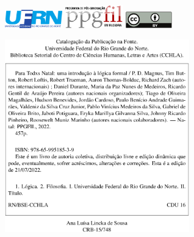 \begin{figure}[b]
  \begin{minipage}{0.33\textwidth}
     \includegraphics[width=2.5cm, left]{./assets/logo-ufrn-flat}
  \end{minipage}%
  \begin{minipage}{0.33\textwidth}
     \centering
     \includegraphics[width=2.5cm]{./assets/ppgfil-logo}
  \end{minipage}
  \begin{minipage}{0.33\textwidth}
     \centering
     \includegraphics[width=2cm]{./assets/by}
  \end{minipage}%
\end{figure}

\newpage


\begin{figure}
\vspace*{8cm}
\centering
\includegraphics[width=8cm]{./assets/ficha-cat}
\end{figure}


\newpage

\thispagestyle{empty}
\onecolumn
\ 
\vfill

